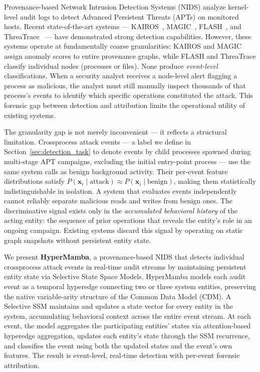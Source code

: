 \documentclass[letterpaper,twocolumn,10pt]{article}
\begin{document}
Provenance-based Network Intrusion Detection Systems (NIDS) analyze kernel-level audit logs to detect Advanced Persistent Threats (APTs) on monitored hosts. Recent state-of-the-art systems --- KAIROS~\cite{cheng2024kairos}, MAGIC~\cite{jia2024magic}, FLASH~\cite{rehman2024flash}, and ThreaTrace~\cite{Wang2021THREATRACEDA} --- have demonstrated strong detection capabilities. However, these systems operate at fundamentally coarse granularities: KAIROS and MAGIC assign anomaly scores to entire provenance graphs, while FLASH and ThreaTrace classify individual nodes (processes or files). None produce \emph{event-level} classifications. When a security analyst receives a node-level alert flagging a process as malicious, the analyst must still manually inspect thousands of that process's events to identify which specific operations constituted the attack. This forensic gap between detection and attribution limits the operational utility of existing systems.

The granularity gap is not merely inconvenient --- it reflects a structural limitation. Crossprocess attack events --- a label we define in Section~\ref{sec:detection_task} to denote events by child processes spawned during multi-stage APT campaigns, excluding the initial entry-point process --- use the same system calls as benign background activity. Their per-event feature distributions satisfy $P(\mathbf{x}_i \mid \text{attack}) \approx P(\mathbf{x}_i \mid \text{benign})$, making them statistically indistinguishable in isolation. A system that evaluates events independently cannot reliably separate malicious reads and writes from benign ones. The discriminative signal exists only in the \emph{accumulated behavioral history} of the acting entity: the sequence of prior operations that reveals the entity's role in an ongoing campaign. Existing systems discard this signal by operating on static graph snapshots without persistent entity state.

We present \textbf{HyperMamba}, a provenance-based NIDS that detects individual crossprocess attack events in real-time audit streams by maintaining persistent entity state via Selective State Space Models. HyperMamba models each audit event as a temporal hyperedge connecting two or three system entities, preserving the native variable-arity structure of the Common Data Model (CDM). A Selective SSM maintains and updates a state vector for every entity in the system, accumulating behavioral context across the entire event stream. At each event, the model aggregates the participating entities' states via attention-based hyperedge aggregation, updates each entity's state through the SSM recurrence, and classifies the event using both the updated states and the event's own features. The result is event-level, real-time detection with per-event forensic attribution.
\end{document}
